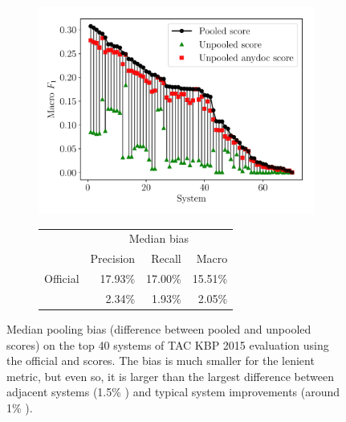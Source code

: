 \begin{figure}[!t]
  \centering
  \begin{subfigure}{\columnwidth}
      \includegraphics[width=0.8\columnwidth]{figures/pooling_bias_f1/pooling_bias/pooling_bias}
    \centering
    \small{\begin{tabular} {l r r r} \toprule
                    & \multicolumn{3}{c}{Median bias} \\
                    & Precision & Recall & Macro \fone{} \\ \midrule 
   Official         & 17.93\% &  17.00\% & 15.51\% \\ 
   \anydoc{}        & 2.34\% &  1.93\% & 2.05\% \\ \bottomrule
   \end{tabular}}
  \end{subfigure}
  \caption[Pooling bias for \fone{} in TAC-KBP 2015]{\label{fig:kbpo:pooling-bias} Median pooling bias (difference between pooled and unpooled scores) on the top 40 systems of TAC KBP 2015 evaluation using the official and \anydoc{} scores.
  The bias is much smaller for the lenient \anydoc{} metric, but even so, it is larger than the largest difference between adjacent systems (1.5\% \fone{}) and typical system improvements (around 1\% \fone{}).
  }
\end{figure}

